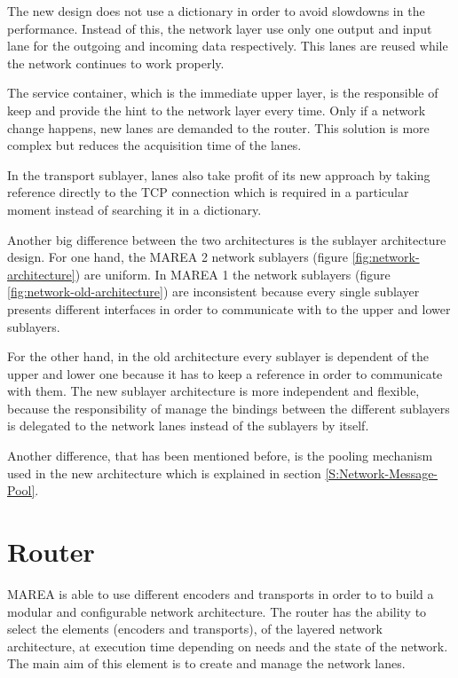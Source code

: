 The new design does not use a dictionary in order to avoid slowdowns in the performance. Instead of this, the network layer use only one output and input lane for the outgoing and incoming data respectively. This lanes are reused while the network continues to work properly. 

The service container, which is the immediate upper layer, is the responsible of keep and provide the hint to the network layer every time. Only if a network change happens, new lanes are demanded to the router. This solution is more complex but reduces the acquisition time of the lanes.

In the transport sublayer, lanes also take profit of its new approach by taking reference directly to the TCP connection which is required in a particular moment instead of searching it in a dictionary.

Another big difference between the two architectures is the sublayer architecture design. For one hand, the MAREA 2 network sublayers (figure \ref{fig:network-architecture}) are uniform. In MAREA 1 the network sublayers (figure \ref{fig:network-old-architecture}) are inconsistent because every single sublayer presents different interfaces in order to communicate with to the upper and lower sublayers. 

For the other hand, in the old architecture every sublayer is dependent of the upper and lower one because it has to keep a reference in order to communicate with them. The new sublayer architecture is more independent and flexible, because the responsibility of manage the bindings between the different sublayers is delegated to the network lanes instead of the sublayers by itself.

Another difference, that has been mentioned before, is the pooling mechanism used in the new architecture which is explained in section \ref{S:Network-Message-Pool}.

\section{Router}\label{S:Router}

MAREA is able to use different encoders and transports in order to to build a modular and configurable network architecture. The router has the ability to select the elements (encoders and transports), of the layered network architecture, at execution time depending on needs and the state of the network. The main aim of this element is to create and manage the network lanes.


